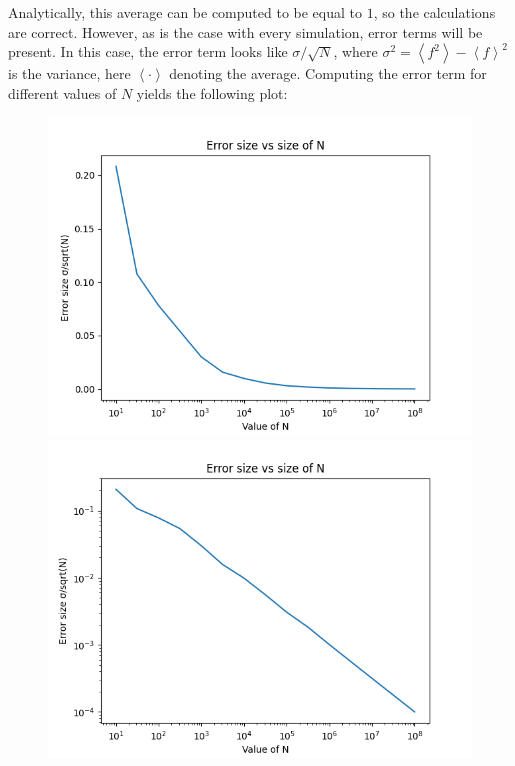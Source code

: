 \documentclass[a4paper,12pt]{article}
\begin{document}
Analytically, this average can be computed to be equal to $1$, so the calculations are correct. However, as is the
case with every simulation, error terms will be present. In this case, the error term looks like $\sigma / \sqrt{N}$,
where $\sigma^2 = \left\langle f^2 \right\rangle - \left\langle f \right\rangle^2$ is the variance, here 
$\left\langle \cdot \right\rangle$ denoting the average. Computing the error term for different values of $N$ yields
the following plot:

\begin{figure}[!ht]
  \centering
  \begin{minipage}{0.49\textwidth}
    \includegraphics[width=\textwidth]{img/3_1_error_size.png}
  \end{minipage}
  \begin{minipage}{0.49\textwidth}
    \includegraphics[width=\textwidth]{img/3_1_error_size_loglog.png}
  \end{minipage}
\end{figure}
\end{document}
